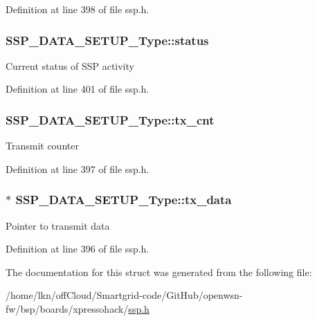 Definition at line 398 of file ssp.\+h.

\subsubsection[{\texorpdfstring{status}{status}}]{ S\+S\+P\+\_\+\+D\+A\+T\+A\+\_\+\+S\+E\+T\+U\+P\+\_\+\+Type\+::status}\hypertarget{struct_s_s_p___d_a_t_a___s_e_t_u_p___type_abf9967b343e936a1e2cbdefbe9f53cea}{}\label{struct_s_s_p___d_a_t_a___s_e_t_u_p___type_abf9967b343e936a1e2cbdefbe9f53cea}
Current status of S\+SP activity 

Definition at line 401 of file ssp.\+h.

\subsubsection[{\texorpdfstring{tx\+\_\+cnt}{tx_cnt}}]{ S\+S\+P\+\_\+\+D\+A\+T\+A\+\_\+\+S\+E\+T\+U\+P\+\_\+\+Type\+::tx\+\_\+cnt}\hypertarget{struct_s_s_p___d_a_t_a___s_e_t_u_p___type_a857e70ea892f6e800fcfc7d971bb1daf}{}\label{struct_s_s_p___d_a_t_a___s_e_t_u_p___type_a857e70ea892f6e800fcfc7d971bb1daf}
Transmit counter 

Definition at line 397 of file ssp.\+h.

\subsubsection[{\texorpdfstring{tx\+\_\+data}{tx_data}}]{$\ast$ S\+S\+P\+\_\+\+D\+A\+T\+A\+\_\+\+S\+E\+T\+U\+P\+\_\+\+Type\+::tx\+\_\+data}\hypertarget{struct_s_s_p___d_a_t_a___s_e_t_u_p___type_a3ce86564e96199f4bed5d67e13016a74}{}\label{struct_s_s_p___d_a_t_a___s_e_t_u_p___type_a3ce86564e96199f4bed5d67e13016a74}
Pointer to transmit data 

Definition at line 396 of file ssp.\+h.



The documentation for this struct was generated from the following file\+:\begin{DoxyCompactItemize}
\item 
/home/lkn/off\+Cloud/\+Smartgrid-\/code/\+Git\+Hub/openwsn-\/fw/bsp/boards/xpressohack/\hyperlink{ssp_8h}{ssp.\+h}\end{DoxyCompactItemize}
